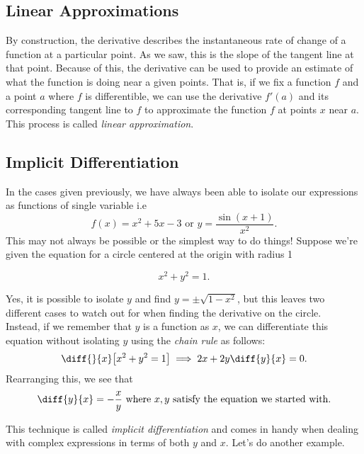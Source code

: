 \subsection{Linear Approximations}

By construction, the derivative describes the instantaneous rate of change of a function at a particular point. As we saw, this is the slope of the tangent line at that point. Because of this, the derivative can be used to provide an estimate of what the function is doing near a given points. That is, if we fix a function $f$ and a point $a$ where $f$ is differentible, we can use the derivative $f'(a)$ and its corresponding tangent line to $f$ to approximate the function $f$ at points $x$ near $a$. This process is called \emph{linear approximation}.


\subsection{Implicit Differentiation}

In the cases given previously, we have always been able to isolate our expressions as functions of single variable i.e
\[
f(x)=x^2+5x-3\text{ or }y=\frac{\sin (x+1)}{x^2}.
\]
This may not always be possible or the simplest way to do things! Suppose we're given the equation for a circle centered at the origin with radius 1

\[
x^2+y^2=1.
\]

Yes, it is possible to isolate $y$ and find $y=\pm \sqrt{1-x^2}$, but this leaves two different cases to watch out for when finding the derivative on the circle.\\

Instead, if we remember that $y$ is a function as $x$, we can differentiate this equation without isolating $y$ using the \emph{chain rule} as follows:
\begin{equation}
  \diff{}{x}\big[x^2+y^2=1\big]\implies 2x+2y\diff{y}{x}=0.
\end{equation}
Rearranging this, we see that
\[
\diff{y}{x}=-\frac{x}{y} \text{ where $x,y$ satisfy the equation we started with.}
\]

This technique is called \emph{implicit differentiation} and comes in handy when dealing with complex expressions in terms of both $y$ and $x$. Let's do another example.

